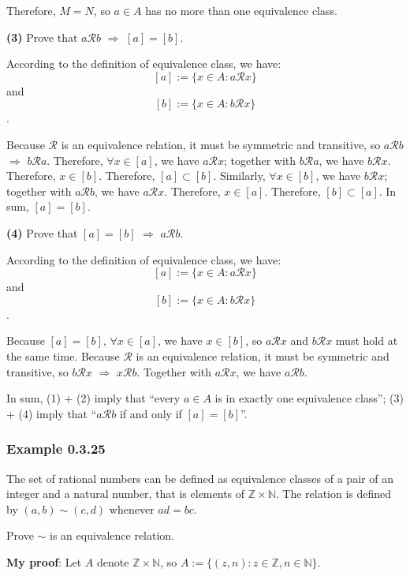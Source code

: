 \documentclass[12pt, letterpaper, oneside]{book}
\begin{document}
Therefore, $M = N$, so $a \in A$ has no more than one equivalence class.

\textbf{(3)} Prove that $a \mathcal{R} b$ $\Rightarrow$ $[a] = [b]$.

According to the definition of equivalence class, we have: \[[a] := \{x \in A:
a \mathcal{R} x\}\] and \[[b] := \{x \in A: b \mathcal{R} x\}\].

Because $\mathcal{R}$ is an equivalence relation, it must be symmetric and
transitive, so $a \mathcal{R} b$ $\Rightarrow$ $b \mathcal{R} a$. Therefore,
$\forall x \in [a]$, we have $a \mathcal{R} x$; together with $b \mathcal{R} a$,
we have $b \mathcal{R} x$. Therefore, $x \in [b]$. Therefore, $[a] \subset [b]$.
Similarly, $\forall x \in [b]$, we have $b \mathcal{R} x$; together with $a
\mathcal{R} b$, we have $a \mathcal{R} x$. Therefore, $x \in [a]$. Therefore,
$[b] \subset [a]$. In sum, $[a] = [b]$.

\textbf{(4)} Prove that $[a] = [b]$ $\Rightarrow$ $a \mathcal{R} b$.

According to the definition of equivalence class, we have: \[[a] := \{x \in A:
a \mathcal{R} x\}\] and \[[b] := \{x \in A: b \mathcal{R} x\}\].

Because $[a] = [b]$, $\forall x \in [a]$, we have $x \in [b]$, so $a
\mathcal{R} x$ and $b \mathcal{R} x$ must hold at the same time. Because
$\mathcal{R}$ is an equivalence relation, it must be symmetric and transitive,
so $b \mathcal{R} x$ $\Rightarrow$ $x \mathcal{R} b$. Together with $a
\mathcal{R} x$, we have $a \mathcal{R} b$.

In sum, (1) + (2) imply that ``every $a \in A$ is in exactly one equivalence
class''; (3) + (4) imply that ``$a \mathcal{R} b$ if and only if $[a] = [b]$''.

\subsubsection*{Example 0.3.25}

The set of rational numbers can be defined as equivalence classes of a pair of
an integer and a natural number, that is elements of $\mathbb{Z} \times
\mathbb{N}$. The relation is defined by $(a, b) \sim (c, d)$ whenever $ad = bc$.

Prove $\sim$ is an equivalence relation.

\colorbox{lime!100}{\textbf{My proof}}: Let $A$ denote $\mathbb{Z} \times
\mathbb{N}$, so $A := \{(z, n): z \in \mathbb{Z}, n \in \mathbb{N}\}$.
\end{document}
